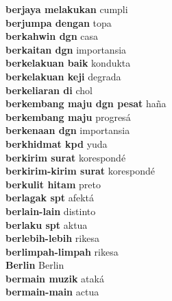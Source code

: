 \textbf{ berjaya melakukan  } cumpli \\
\textbf{ berjumpa dengan  } topa \\
\textbf{ berkahwin dgn  } casa \\
\textbf{ berkaitan dgn  } importansia \\
\textbf{ berkelakuan baik  } kondukta \\
\textbf{ berkelakuan keji  } degrada \\
\textbf{ berkeliaran di  } chol \\
\textbf{ berkembang maju dgn pesat  } haña \\
\textbf{ berkembang maju  } progresá \\
\textbf{ berkenaan dgn  } importansia \\
\textbf{ berkhidmat kpd  } yuda \\
\textbf{ berkirim surat  } korespondé \\
\textbf{ berkirim-kirim surat  } korespondé \\
\textbf{ berkulit hitam  } preto \\
\textbf{ berlagak spt  } afektá \\
\textbf{ berlain-lain  } distinto \\
\textbf{ berlaku spt  } aktua \\
\textbf{ berlebih-lebih  } rikesa \\
\textbf{ berlimpah-limpah  } rikesa \\
\textbf{ Berlin  } Berlin \\
\textbf{ bermain muzik  } ataká \\
\textbf{ bermain-main  } actua \\
